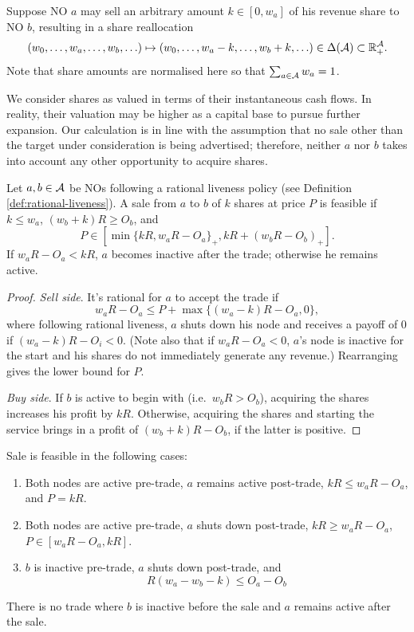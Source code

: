 Suppose NO $a$ may sell an arbitrary amount $k\in[0,w_a]$ of his revenue share to NO $b$, resulting in a share reallocation
\[
  (w_0,\ldots,w_a,\ldots,w_b,\ldots) \mapsto (w_0,\ldots,w_a-k,\ldots,w_b+k,\ldots) \in \Delta(\mathcal{A})\subset\mathbb{R}_+^{\mathcal{A}}.
\]
Note that share amounts are normalised here so that $\sum_{a\in\mathcal{A}}w_a=1$.

We consider shares as valued in terms of their instantaneous cash flows.
%
In reality, their valuation may be higher as a capital base to pursue further expansion.
%
Our calculation is in line with the assumption that no sale other than the target under consideration is being advertised; therefore, neither $a$ nor $b$ takes into account any other opportunity to acquire shares.

\begin{proposition}

  Let $a,b\in\mathcal{A}$ be NOs following a rational liveness policy (see Definition \ref{def:rational-liveness}).
  A sale from $a$ to $b$ of $k$ shares at price $P$ is feasible if $k\leq w_a$, $(w_b+k)R\geq O_b$, and
  \[
    P\in [\min\{kR,w_aR-O_a\}_+, kR + (w_bR-O_b)_+].
  \]  
  If $w_aR-O_a < kR$, $a$ becomes inactive after the trade; otherwise he remains active.
  
\end{proposition}
%
\begin{proof}

  \emph{Sell side}. It's rational for $a$ to accept the trade if
  \[
      w_a R - O_a \leq P + \max\{ (w_a-k) R - O_a, 0\},
  \]
  where following rational liveness, $a$ shuts down his node and receives a payoff of $0$ if $(w_a-k)R-O_i < 0$.
  (Note also that if $w_aR-O_a<0$, $a$'s node is inactive for the start and his shares do not immediately generate any revenue.)
  Rearranging gives the lower bound for $P$.

  \emph{Buy side}. If $b$ is active to begin with (i.e.~$w_bR>O_b$), acquiring the shares increases his profit by $kR$.
  Otherwise, acquiring the shares and starting the service brings in a profit of $(w_b+k)R-O_b$, if the latter is positive. \qedhere

\end{proof}

\begin{corollary}

  Sale is feasible in the following cases:
  \begin{enumerate}
    \item Both nodes are active pre-trade, $a$ remains active post-trade, $kR\leq w_aR-O_a$, and $P=kR$.
    \item Both nodes are active pre-trade, $a$ shuts down post-trade, $kR\geq w_aR-O_a$, $P\in[w_aR-O_a,kR]$.
    \item $b$ is inactive pre-trade, $a$ shuts down post-trade, and \[ R(w_a-w_b-k) \leq O_a-O_b \]
  \end{enumerate}
  There is no trade where $b$ is inactive before the sale and $a$ remains active after the sale.

\end{corollary}


